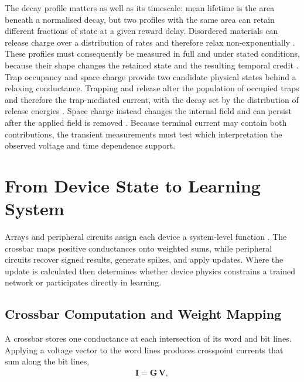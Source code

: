 \noindent The decay profile matters as well as its timescale: mean lifetime is the area beneath a normalised decay,
but two profiles with the same area can retain different fractions of state at a given reward delay. Disordered
materials can release charge over a distribution of rates and therefore relax non-exponentially
\cite{scher1975anomalous, kakalios1987stretched}. These profiles must consequently be measured in full and under
stated conditions, because their shape changes the retained state and the resulting temporal credit
\cite{legallo2018collective, zhang2024mesoporous}.\\

\noindent Trap occupancy and space charge provide two candidate physical states behind a relaxing conductance.
Trapping and release alter the population of occupied traps and therefore the trap-mediated current, with the decay
set by the distribution of release energies \cite{lang1974deep, libsch1993bias}. Space charge instead changes the
internal field and can persist after the applied field is removed \cite{el2006space, boikov2002near}. Because
terminal current may contain both contributions, the transient measurements must test which interpretation the
observed voltage and time dependence support.

\section[From Device State to Learning System]{From Device State to Learning
System}\label{sec:neuro-hardware}

\noindent Arrays and peripheral circuits assign each device a system-level function
\cite{mead1989analog, ceolini2020hand}. The crossbar maps positive conductances onto weighted sums, while peripheral
circuits recover signed results, generate spikes, and apply updates. Where the update is calculated then
determines whether device physics constrains a trained network or participates directly in learning.

\subsection[Crossbar Computation and Weight Mapping]{Crossbar Computation and Weight
Mapping}\label{subsec:crossbar}

\noindent A crossbar stores one conductance at each intersection of its word and bit lines. Applying a voltage vector
to the word lines produces crosspoint currents that sum along the bit lines,
\begin{align}
    \mathbf{I} = \mathbf{G}\,\mathbf{V}, \label{eq:2.6}
\end{align}

